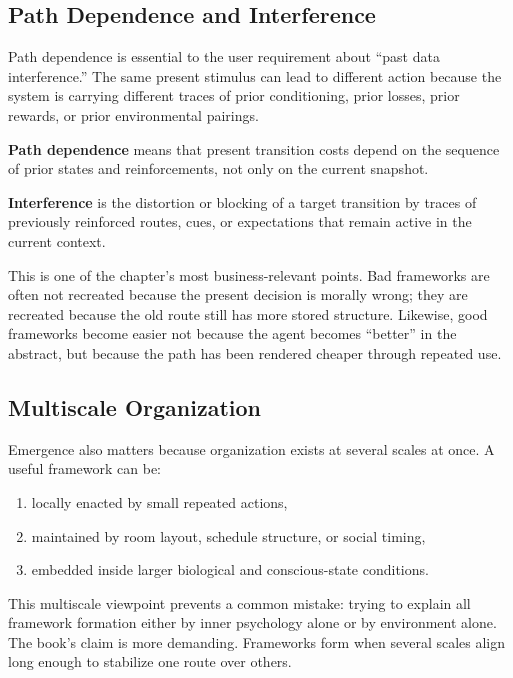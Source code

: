 \subsection{Path Dependence and Interference}

Path dependence is essential to the user requirement about ``past data
interference.'' The same present stimulus can lead to different action because
the system is carrying different traces of prior conditioning, prior losses,
prior rewards, or prior environmental pairings.

\begin{definition}
\textbf{Path dependence} means that present transition costs depend on the
sequence of prior states and reinforcements, not only on the current snapshot.
\end{definition}

\begin{definition}[Interference]
\textbf{Interference} is the distortion or blocking of a target transition by
traces of previously reinforced routes, cues, or expectations that remain
active in the current context.
\end{definition}

\begin{discussion}
This is one of the chapter's most business-relevant points. Bad frameworks are
often not recreated because the present decision is morally wrong; they are
recreated because the old route still has more stored structure. Likewise, good
frameworks become easier not because the agent becomes ``better'' in the
abstract, but because the path has been rendered cheaper through repeated use.
\end{discussion}

\subsection{Multiscale Organization}

Emergence also matters because organization exists at several scales at once.
A useful framework can be:
\begin{enumerate}[nosep]
  \item locally enacted by small repeated actions,
  \item maintained by room layout, schedule structure, or social timing,
  \item embedded inside larger biological and conscious-state conditions.
\end{enumerate}

This multiscale viewpoint prevents a common mistake: trying to explain all
framework formation either by inner psychology alone or by environment alone.
The book's claim is more demanding. Frameworks form when several scales align
long enough to stabilize one route over others.
